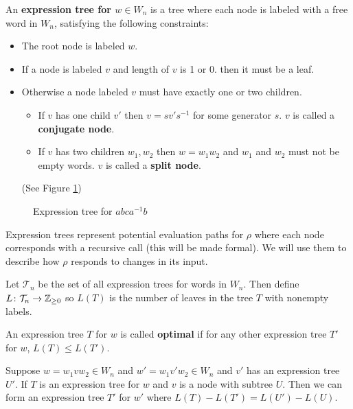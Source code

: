 \documentclass[12pt]{thesis}
\begin{document}
\begin{definition}
    An \textbf{expression tree for $w \in W_{n}$} is a tree where
    each node is labeled with a free word in $W_{n}$,
    satisfying the following constraints:
    \begin{itemize}
    \item The root node is labeled $w$.
    \item If a node is labeled $v$ and length of $v$ is 1 or 0.
    then it must be a leaf.
    \item Otherwise a node labeled $v$ must have exactly one
    or two children.
    \begin{itemize}
    \item If $v$ has one child $v'$ then $v = sv's^{-1}$ for some
    generator $s$.
            $v$ is called a \textbf{conjugate node}.
    \item If $v$ has two  children $w_{1}, w_{2}$ then $w = w_{1}w_{2}$
        and $w_{1}$ and $w_{2}$ must not be empty words.
         $v$ is called a \textbf{split node}.
    \end{itemize}
    (See Figure \ref{fig:expression-tree})
    \end{itemize}
\end{definition}

\begin{figure}[h]
    \centering
    \def\svgwidth{6cm}
    
    \caption{Expression tree for $abca^{-1}b$}
    \label{fig:expression-tree}
\end{figure}

Expression trees represent potential evaluation paths
for $\rho$ where each node corresponds
with a recursive call (this will be made formal).
We will use them to describe how $\rho$
responds to changes in its input.

Let $\mathcal{T}_{n}$ be the set
of all expression trees for words in $W_{n}$.
Then define $L \colon \mathcal{T}_{n} \rightarrow \mathbb{Z}_{\geq 0}$ 
so $L(T)$ is the number
of leaves in the tree $T$ with nonempty labels.
\begin{definition}
    An expression tree $T$ for $w$
    is called \textbf{optimal}
    if
    for any other expression tree $T'$ for $w$,
    $L(T) \leq L(T')$.
\end{definition}

\begin{proposition}
    \label{prop:replace-node}
    Suppose $w = w_{1} v w_{2} \in W_{n}$
    and $w' = w_{1} v' w_{2} \in W_{n}$
    and $v'$ has an expression tree $U'$.
    If $T$ is an expression tree
    for $w$ and $v$ is a node with subtree $U$.
    Then we can form an expression tree $T'$
    for $w'$ where $ L(T) - L(T') = L(U') - L(U)$.
\end{proposition}
\end{document}
